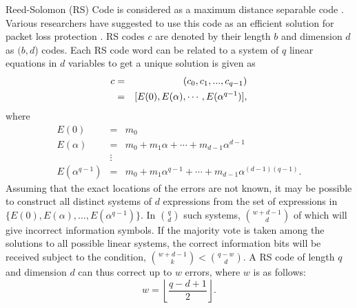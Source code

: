 \noindent Reed-Solomon (RS) Code  is considered as a maximum distance separable code \cite{wicker1994,solanki2004}. Various researchers have suggested to use this code as an efficient solution for packet loss protection \cite{solanki2004}. RS codes $c$ are denoted by their length $b$ and dimension $d$ as $(b, d$) codes. Each RS code word can be related to a system of $q$ linear equations in $d$ variables to get a unique solution is given as \vspace{-.5cm}
\begin{eqnarray}
  c &=& (c_0,c_1,...,c_{q-1}) \nonumber \\
    &=& [E(0),E(\alpha),\cdots,E(\alpha^{q-1})],  \nonumber  
    \label{eqc}\vspace{-2cm}
\end{eqnarray}
where
\vspace{-1cm}
\begin{eqnarray}
   E(0) &=& m_0   \nonumber    \\
   E(\alpha) &=& m_0 + m_1\alpha + \cdots + m_{d-1}\alpha^{d-1} \nonumber  \\  
   &\vdots  \nonumber \\ 
   E(\alpha^{q-1}) &=& m_0 + m_1\alpha^{q-1} + \cdots + m_{d-1}\alpha^{(d-1)(q-1)}.  \nonumber
\end{eqnarray}
Assuming that the exact locations of the errors are not known, it may be possible to construct all distinct systems of $d$ expressions from the set of expressions in $\{E(0),E(\alpha),\hdots,E(\alpha^{q-1})\}$. In $\binom{q}{d}$ such systems, $\binom{w+d-1}{d}$ of which will give incorrect information symbols. If the majority vote is taken among the solutions to all possible linear systems, the correct information bits will be received subject to the condition, $\binom{w+d-1}{k} < \binom{q-w}{d}$. A RS code of length $q$ and dimension $d$ can thus correct up to $w$ errors, where $w$ is as follows:
\begin{equation}
w = \left \lfloor  \frac{q - d + 1}{2} \right \rfloor. \nonumber
\label{equ:RS}
\end{equation}
